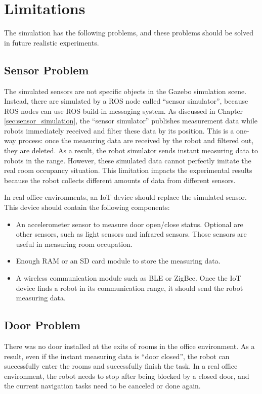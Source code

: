 \section{Limitations}
\label{sec:limitations} 

The simulation has the following problems, and these problems should be solved in future realistic experiments.

\subsection*{Sensor Problem}
The simulated sensors are not specific objects in the Gazebo simulation scene. Instead, there are simulated by a ROS node called ``sensor simulator'', because ROS nodes can use ROS build-in messaging system. As discussed in Chapter \ref{sec:sensor_simulation}, the ``sensor simulator'' publishes measurement data while robots immediately received and filter these data by its position. This is a one-way process: once the measuring data are received by the robot and filtered out, they are deleted. As a result, the robot simulator sends instant measuring data to robots in the range. However, these simulated data cannot perfectly imitate the real room occupancy situation. This limitation impacts the experimental results because the robot collects different amounts of data from different sensors.

In real office environments, an IoT device should replace the simulated sensor. This device should contain the following components:
 \begin{itemize}
 \item An accelerometer sensor to measure door open/close status. Optional are other sensors, such as light sensors and infrared sensors. Those sensors are useful in measuring room occupation. 
 \item Enough RAM or an SD card module to store the measuring data.
 \item A wireless communication module such as BLE or ZigBee. Once the IoT device finds a robot in its communication range, it should send the robot measuring data.
 \end{itemize}
 
\subsection*{Door Problem}
There was no door installed at the exits of rooms in the office environment. As a result, even if the instant measuring data is ``door closed'', the robot can successfully enter the rooms and successfully finish the task. In a real office environment, the robot needs to stop after being blocked by a closed door, and the current navigation tasks need to be canceled or done again. 

